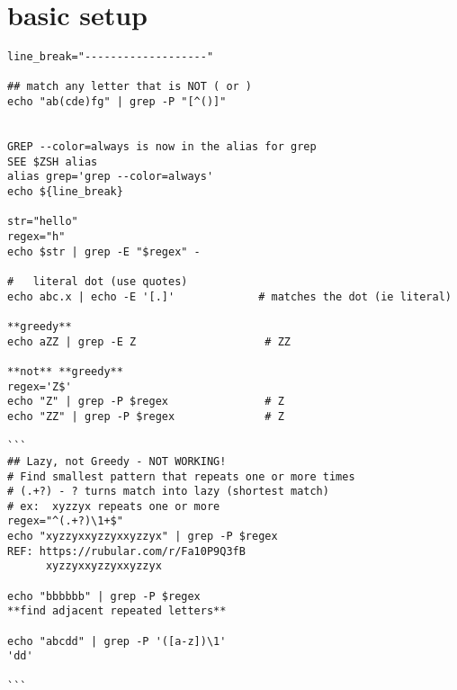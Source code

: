 \section{basic setup}
\begin{verbatim}
line_break="-------------------"

## match any letter that is NOT ( or )
echo "ab(cde)fg" | grep -P "[^()]"


GREP --color=always is now in the alias for grep
SEE $ZSH alias
alias grep='grep --color=always'
echo ${line_break}

str="hello"
regex="h"
echo $str | grep -E "$regex" -

#   literal dot (use quotes)
echo abc.x | echo -E '[.]'             # matches the dot (ie literal)

**greedy**
echo aZZ | grep -E Z                    # ZZ

**not** **greedy**
regex='Z$'
echo "Z" | grep -P $regex               # Z
echo "ZZ" | grep -P $regex              # Z

```
## Lazy, not Greedy - NOT WORKING!	
# Find smallest pattern that repeats one or more times
# (.+?) - ? turns match into lazy (shortest match)
# ex:  xyzzyx repeats one or more
regex="^(.+?)\1+$"
echo "xyzzyxxyzzyxxyzzyx" | grep -P $regex 
REF: https://rubular.com/r/Fa10P9Q3fB
      xyzzyxxyzzyxxyzzyx

echo "bbbbbb" | grep -P $regex 
**find adjacent repeated letters**

echo "abcdd" | grep -P '([a-z])\1'
'dd'

```
\end{verbatim}

